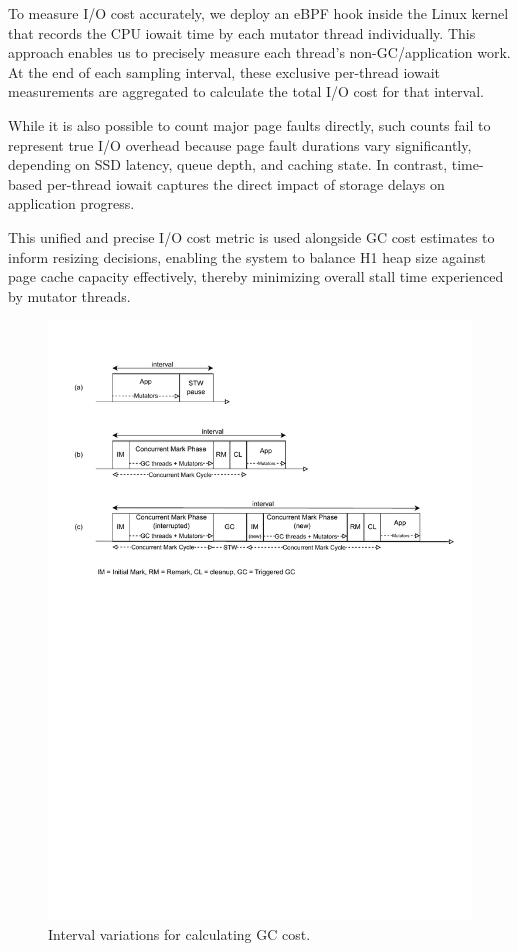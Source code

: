 To measure I/O cost accurately, we deploy an eBPF hook inside the Linux kernel that records the CPU iowait time by each mutator thread individually. This approach enables us to precisely measure each thread's non-GC/application work. At the end of each sampling interval, these exclusive per-thread iowait measurements are aggregated to calculate the total I/O cost for that interval.

While it is also possible to count major page faults directly, such counts fail to represent true I/O overhead because page fault durations vary significantly, depending on SSD latency, queue depth, and caching state. In contrast, time-based per-thread iowait captures the direct impact of storage delays on application progress.

This unified and precise I/O cost metric is used alongside GC cost estimates to inform resizing decisions, enabling the system to balance H1 heap size against page cache capacity effectively, thereby minimizing overall stall time experienced by mutator threads.


\begin{figure}[t]
  \centering
  \includegraphics[width=\textwidth]{fig/intervals.pdf}
  \caption{Interval variations for calculating GC cost.}
  \label{fig:intervals}
\end{figure}

